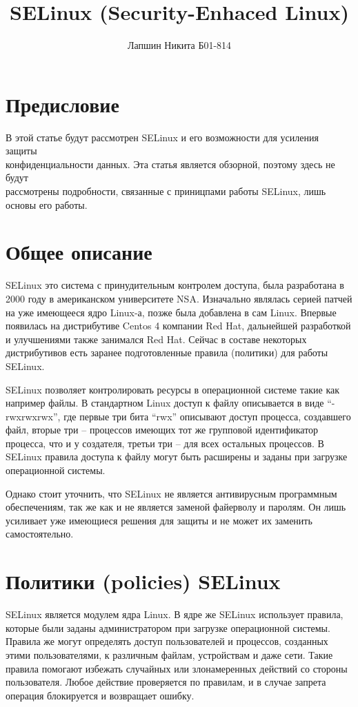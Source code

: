 \documentclass{article}
\title{SELinux (Security-Enhaced Linux)}
\author{Лапшин Никита Б01-814}
\begin{document}
\maketitle



\section{Предисловие}

В этой статье будут рассмотрен SELinux и его возможности для усиления защиты \\конфиденциальности данных. Эта статья является обзорной, поэтому здесь не будут \\рассмотрены подробности, связанные с приницпами работы SELinux, лишь основы его работы.

\section{Общее описание}
SELinux это система с принудительным контролем доступа, была разработана в 2000 году в американском университете NSA. Изначально являлась серией патчей на уже имеющееся ядро Linux-а, позже была добавлена в сам Linux. Впервые появилась на дистрибутиве Centos 4 компании Red Hat, дальнейшей разработкой и улучшениями также занимался Red Hat. Сейчас в составе некоторых дистрибутивов есть заранее подготовленные правила (политики) для работы SELinux.

SELinux позволяет контролировать ресурсы в операционной системе такие как например файлы. В стандартном Linux доступ к файлу описывается в виде “-rwxrwxrwx”, где первые три бита “rwx” описывают доступ процесса, создавшего файл, вторые три – процессов имеющих тот же групповой идентификатор процесса, что и у создателя, третьи три – для всех остальных процессов. В SELinux правила доступа к файлу могут быть расширены и заданы при загрузке операционной системы.

Однако стоит уточнить, что SELinux не является антивирусным программным обеспечениям, так же как и не является заменой файерволу и паролям. Он лишь усиливает уже имеющиеся решения для защиты и не может их заменить самостоятельно.

\section {Политики (policies) SELinux}
SELinux является модулем ядра Linux. В ядре же SELinux использует правила, которые были заданы администратором при загрузке операционной системы. Правила же могут определять доступ пользователей и процессов, созданных этими пользователями, к различным файлам, устройствам и даже сети. Такие правила помогают избежать случайных или злонамеренных действий со стороны пользователя. Любое действие проверяется по правилам, и в случае запрета операция блокируется и возвращает ошибку.
\end{document}
